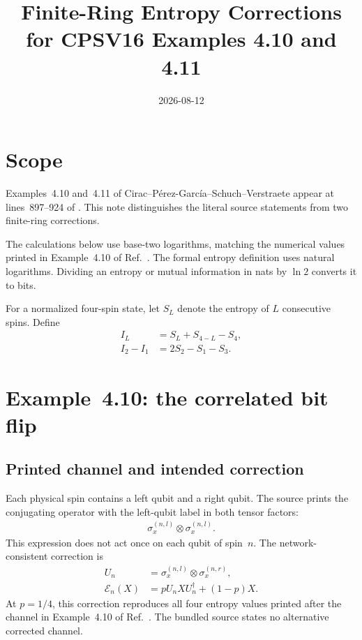 \documentclass{article}
\title{Finite-Ring Entropy Corrections for CPSV16 Examples 4.10 and 4.11}
\author{}
\date{2026-08-12}
\begin{document}
\maketitle
{}

\section{Scope}

Examples~4.10 and~4.11 of Cirac--P\'erez-Garc\'ia--Schuch--Verstraete appear
at lines~897--924 of
\cite{Cirac2016MPDO_arXiv}. This note distinguishes the literal source
statements from two finite-ring corrections.

The calculations below use base-two logarithms, matching the numerical values
printed in Example~4.10 of Ref.~\cite{Cirac2016MPDO_arXiv}. The formal entropy
definition uses natural logarithms. Dividing an entropy or mutual information
in nats by $\ln 2$ converts it to bits.

For a normalized four-spin state, let $S_L$ denote the entropy of $L$
consecutive spins. Define
\begin{align}
    I_L
        &= S_L+S_{4-L}-S_4,
    \label{eq:cpsv16_examples_4_10_4_11_entropy_mutual_information}\\
    I_2-I_1
        &= 2S_2-S_1-S_3.
    \label{eq:cpsv16_examples_4_10_4_11_entropy_mutual_information_defect}
\end{align}

\section{Example~4.10: the correlated bit flip}

\subsection{Printed channel and intended correction}

Each physical spin contains a left qubit and a right qubit. The source prints
the conjugating operator with the left-qubit label in both tensor factors:
\begin{align}
    \sigma_x^{(n,l)}\otimes\sigma_x^{(n,l)}.
    \label{eq:cpsv16_examples_4_10_4_11_entropy_printed_flip}
\end{align}
This expression does not act once on each qubit of spin~$n$. The
network-consistent correction is
\begin{align}
    U_n
        &= \sigma_x^{(n,l)}\otimes\sigma_x^{(n,r)},
    \label{eq:cpsv16_examples_4_10_4_11_entropy_corrected_flip}\\
    \mathcal E_n(X)
        &= pU_nXU_n^\dagger+(1-p)X.
    \label{eq:cpsv16_examples_4_10_4_11_entropy_corrected_channel}
\end{align}
At $p=1/4$, this correction reproduces all four entropy values printed after
the channel in Example~4.10 of Ref.~\cite{Cirac2016MPDO_arXiv}. The bundled
source states no alternative corrected channel.
\end{document}
